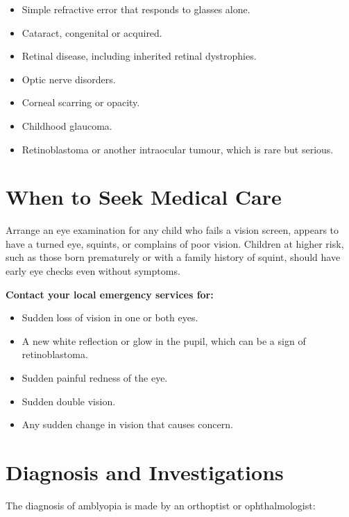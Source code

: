 \begin{itemize}
    \item Simple refractive error that responds to glasses alone.
    \item Cataract, congenital or acquired.
    \item Retinal disease, including inherited retinal dystrophies.
    \item Optic nerve disorders.
    \item Corneal scarring or opacity.
    \item Childhood glaucoma.
    \item Retinoblastoma or another intraocular tumour, which is rare but serious.
\end{itemize}

\section*{When to Seek Medical Care}
Arrange an eye examination for any child who fails a vision screen, appears to have a turned eye, squints, or complains of poor vision. Children at higher risk, such as those born prematurely or with a family history of squint, should have early eye checks even without symptoms.

\textbf{Contact your local emergency services for:}
\begin{itemize}
    \item Sudden loss of vision in one or both eyes.
    \item A new white reflection or glow in the pupil, which can be a sign of retinoblastoma.
    \item Sudden painful redness of the eye.
    \item Sudden double vision.
    \item Any sudden change in vision that causes concern.
\end{itemize}

\section*{Diagnosis and Investigations}
The diagnosis of amblyopia is made by an orthoptist or ophthalmologist:

